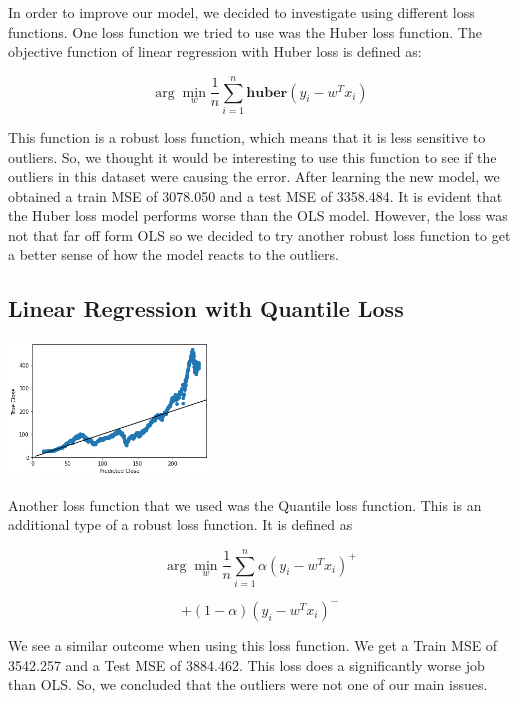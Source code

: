\documentclass[final,5p,times,twocolumn,authoryear, 12pt]{elsarticle}
\begin{document}
In order to improve our model, we decided to investigate using different loss functions. One loss function we tried to use was the Huber loss function.  The objective function of linear regression with Huber loss is defined as:

\begin{adjustwidth}{1cm}{}
    \[
        \arg \min_w \frac{1}{n} \sum_{i = 1}^{n} \textbf{huber}(y_i - w^T x_i)
    \]
\end{adjustwidth}

This function is a robust loss function, which means that it is less sensitive to outliers. So, we thought it would be interesting to use this function to see if the outliers in this dataset were causing the error. After learning the new model, we obtained a train MSE of 3078.050 and a test MSE of 3358.484. It is evident that the Huber loss model performs worse than the OLS model. However, the loss was not that far off form OLS so we decided to try another robust loss function to get a better sense of how the model reacts to the outliers.

\subsection{Linear Regression with Quantile Loss}

\includegraphics[width=0.4\textwidth, angle=0]{linregQ.png}		

Another loss function that we used was the Quantile loss function. This is an additional type of a robust loss function. It is defined as 

\begin{adjustwidth}{1.4cm}{}
    \[
        \arg \min_w \frac{1}{n} \sum_{i = 1}^{n} \alpha (y_i - w^Tx_i)^+
    \]
\end{adjustwidth}
\begin{adjustwidth}{2.0cm}{}
    \[
        + (1 - \alpha) (y_i - w^Tx_i)^-
    \]
\end{adjustwidth}

We see a similar outcome when using this loss function. We get a Train MSE of 3542.257 and a Test MSE of 3884.462. This loss does a significantly worse job than OLS. So, we concluded that the outliers were not one of our main issues.
\end{document}
